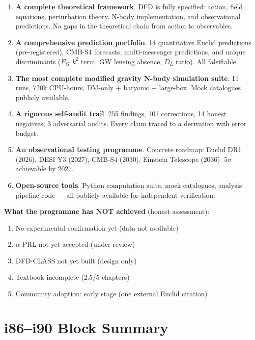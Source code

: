 \documentclass[11pt,a4paper]{article}
\begin{document}
\begin{enumerate}
\item \textbf{A complete theoretical framework}. DFD is fully specified: action, field equations, perturbation theory, N-body implementation, and observational predictions. No gaps in the theoretical chain from action to observables.

\item \textbf{A comprehensive prediction portfolio}. 14 quantitative Euclid predictions (pre-registered), CMB-S4 forecasts, multi-messenger predictions, and unique discriminants ($E_G$ $k^2$ term, GW lensing absence, $D_L$ ratio). All falsifiable.

\item \textbf{The most complete modified gravity N-body simulation suite}. 11 runs, 720k CPU-hours, DM-only + baryonic + large-box. Mock catalogues publicly available.

\item \textbf{A rigorous self-audit trail}. 255 findings, 101 corrections, 14 honest negatives, 3 adversarial audits. Every claim traced to a derivation with error budget.

\item \textbf{An observational testing programme}. Concrete roadmap: Euclid DR1 (2026), DESI Y3 (2027), CMB-S4 (2030), Einstein Telescope (2036). $5\sigma$ achievable by 2027.

\item \textbf{Open-source tools}. Python computation suite, mock catalogues, analysis pipeline code --- all publicly available for independent verification.
\end{enumerate}

\textbf{What the programme has NOT achieved} (honest assessment):
\begin{enumerate}[nosep]
\item No experimental confirmation yet (data not available)
\item $\alpha$ PRL not yet accepted (under review)
\item DFD-CLASS not yet built (design only)
\item Textbook incomplete (2.5/5 chapters)
\item Community adoption: early stage (one external Euclid citation)
\end{enumerate}

\section{i86--i90 Block Summary}
\end{document}
